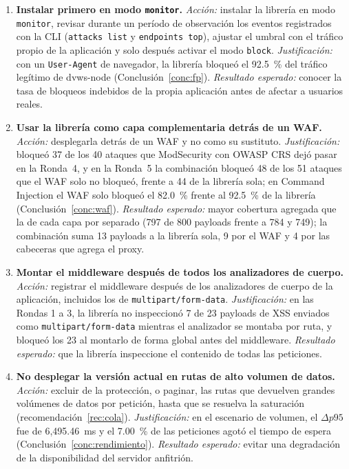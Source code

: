 \begin{enumerate}
    \item \textbf{Instalar primero en modo \texttt{monitor}.} \textit{Acción:} instalar la librería
    en modo \texttt{monitor}, revisar durante un período de observación los eventos registrados con
    la CLI (\texttt{attacks list} y \texttt{endpoints top}), ajustar el umbral con el tráfico propio
    de la aplicación y solo después activar el modo \texttt{block}. \textit{Justificación:} con un
    \texttt{User-Agent} de navegador, la librería bloqueó el 92.5~\% del tráfico legítimo de
    dvws-node (Conclusión~\ref{conc:fp}). \textit{Resultado esperado:} conocer la tasa de bloqueos
    indebidos de la propia aplicación antes de afectar a usuarios reales.

    \item \textbf{Usar la librería como capa complementaria detrás de un WAF.}
    \textit{Acción:} desplegarla detrás de un WAF y no como su sustituto. \textit{Justificación:}
    bloqueó 37 de los 40 ataques que ModSecurity con OWASP CRS dejó pasar en la Ronda~4, y en la
    Ronda~5 la combinación bloqueó 48 de los 51 ataques que el WAF solo no bloqueó, frente a 44 de la
    librería sola; en Command Injection el WAF solo bloqueó el 82.0~\% frente al 92.5~\% de la
    librería (Conclusión~\ref{conc:waf}). \textit{Resultado esperado:} mayor cobertura agregada que la
    de cada capa por separado (797 de 800 payloads frente a 784 y 749); la combinación suma 13
    payloads a la librería sola, 9 por el WAF y 4 por las cabeceras que agrega el proxy.

    \item \textbf{Montar el middleware después de todos los analizadores de cuerpo.}
    \textit{Acción:} registrar el middleware después de los analizadores de cuerpo de la aplicación,
    incluidos los de \texttt{multipart/form-data}. \textit{Justificación:} en las Rondas 1 a 3, la
    librería no inspeccionó 7 de 23 payloads de XSS enviados como \texttt{multipart/form-data}
    mientras el analizador se montaba por ruta, y bloqueó los 23 al montarlo de forma global antes
    del middleware. \textit{Resultado esperado:} que la librería inspeccione el contenido de todas
    las peticiones.

    \item \textbf{No desplegar la versión actual en rutas de alto volumen de datos.}
    \textit{Acción:} excluir de la protección, o paginar, las rutas que devuelven grandes volúmenes
    de datos por petición, hasta que se resuelva la saturación (recomendación~\ref{rec:cola}).
    \textit{Justificación:} en el escenario de volumen, el $\Delta p95$ fue de 6{,}495.46~ms y el
    7.00~\% de las peticiones agotó el tiempo de espera (Conclusión~\ref{conc:rendimiento}).
    \textit{Resultado esperado:} evitar una degradación de la disponibilidad del servidor anfitrión.
\end{enumerate}

